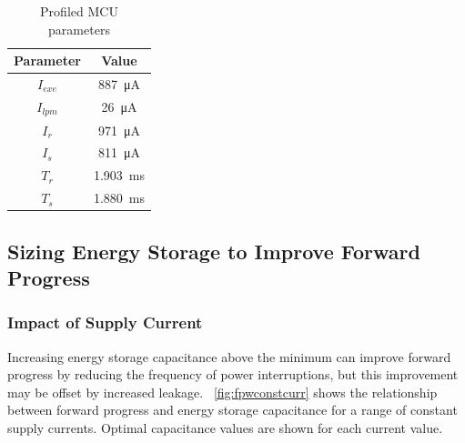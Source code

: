 \begin{table}[!t]
    \renewcommand{\arraystretch}{1.2}
    \centering
    \caption{Profiled MCU parameters}
    \label{tab:load}
    \begin{tabular}{|c|c|}
    \hline
    \textbf{Parameter} & \textbf{Value}\\
    \hline
    $I_{exe}$ & \SI{887}{\micro\ampere}\\
    $I_{lpm}$ & \SI{26}{\micro\ampere}\\
    $I_{r}$ & \SI{971}{\micro\ampere}\\
    $I_{s}$ & \SI{811}{\micro\ampere}\\
    $T_{r}$ & \SI{1.903}{\milli\second}\\
    $T_{s}$ & \SI{1.880}{\milli\second}\\
    \hline
    \end{tabular}
\end{table}



\subsection{Sizing Energy Storage to Improve Forward Progress} \label{subsec:sizees}


\subsubsection{Impact of Supply Current}

Increasing energy storage capacitance above the minimum can improve forward progress by reducing the frequency of power interruptions, but this improvement may be offset by increased leakage. \figurename{~\ref{fig:fpwconstcurr}} shows the relationship between forward progress and energy storage capacitance for a range of constant supply currents. Optimal capacitance values are shown for each current value.

